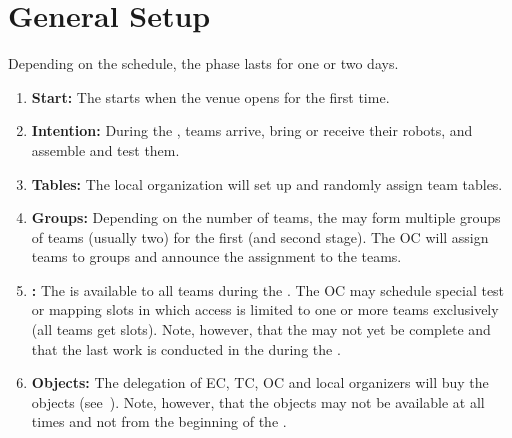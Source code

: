 \section{General Setup}
\label{sec:general_setup}
Depending on the schedule, the  phase lasts for one or two days.

\begin{enumerate}
	\item \textbf{Start:} The  starts when the venue opens for the first time.
	\item \textbf{Intention:} During the , teams arrive, bring or receive their robots, and assemble and test them.
	\item \textbf{Tables:} The local organization will set up and randomly assign team tables.
	\item \textbf{Groups:} Depending on the number of teams, the \OC{} may form multiple groups of teams (usually two) for the first (and second stage). The OC will assign teams to groups and announce the assignment to the teams.
	\item \textbf{\Arena{}:} The \Arena{} is available to all teams during the . The OC may schedule special test or mapping slots in which \Arena{} access is limited to one or more teams exclusively (all teams get slots). Note, however, that the \Arena{} may not yet be complete and that the last work is conducted in the \Arena{} during the \SetupDays.
	\item \textbf{Objects:} The delegation of EC, TC, OC and local organizers will buy the objects (see~). Note, however, that the objects may not be available at all times and not from the beginning of the .
\end{enumerate}

